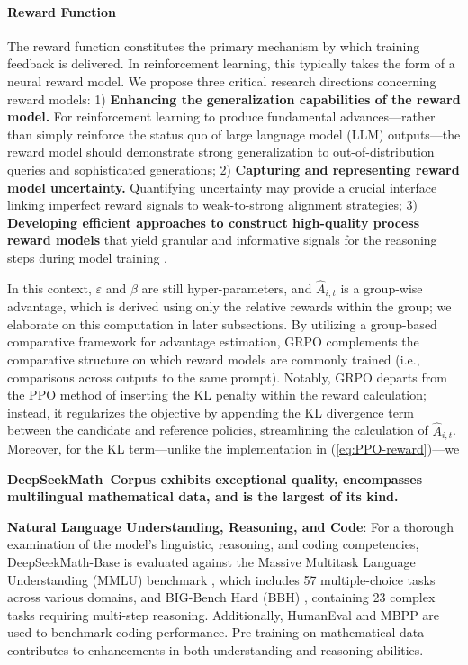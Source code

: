 \paragraph{Reward Function} The reward function constitutes the primary mechanism by which training feedback is delivered. In reinforcement learning, this typically takes the form of a neural reward model. We propose three critical research directions concerning reward models: 1) \textbf{Enhancing the generalization capabilities of the reward model.} For reinforcement learning to produce fundamental advances—rather than simply reinforce the status quo of large language model (LLM) outputs—the reward model should demonstrate strong generalization to out-of-distribution queries and sophisticated generations; 2) \textbf{Capturing and representing reward model uncertainty.} Quantifying uncertainty may provide a crucial interface linking imperfect reward signals to weak-to-strong alignment strategies; 3) \textbf{Developing efficient approaches to construct high-quality process reward models} that yield granular and informative signals for the reasoning steps during model training \citep{lightman2023let,wang2023math}.

In this context, $\varepsilon$ and $\beta$ are still hyper-parameters, and $\hat{A}_{i,t}$ is a group-wise advantage, which is derived using only the relative rewards within the group; we elaborate on this computation in later subsections. By utilizing a group-based comparative framework for advantage estimation, GRPO complements the comparative structure on which reward models are commonly trained (i.e., comparisons across outputs to the same prompt). Notably, GRPO departs from the PPO method of inserting the KL penalty within the reward calculation; instead, it regularizes the objective by appending the KL divergence term between the candidate and reference policies, streamlining the calculation of $\hat{A}_{i,t}$. Moreover, for the KL term—unlike the implementation in (\ref{eq:PPO-reward})—we

\textbf{DeepSeekMath~Corpus exhibits exceptional quality, encompasses multilingual mathematical data, and is the largest of its kind.}

\item \textbf{Natural Language Understanding, Reasoning, and Code}: For a thorough examination of the model's linguistic, reasoning, and coding competencies, DeepSeekMath-Base is evaluated against the Massive Multitask Language Understanding (MMLU) benchmark \citep{mmlu}, which includes 57 multiple-choice tasks across various domains, and BIG-Bench Hard (BBH) \citep{bbh}, containing 23 complex tasks requiring multi-step reasoning. Additionally, HumanEval \citep{codex} and MBPP \citep{mbpp} are used to benchmark coding performance. Pre-training on mathematical data contributes to enhancements in both understanding and reasoning abilities.

